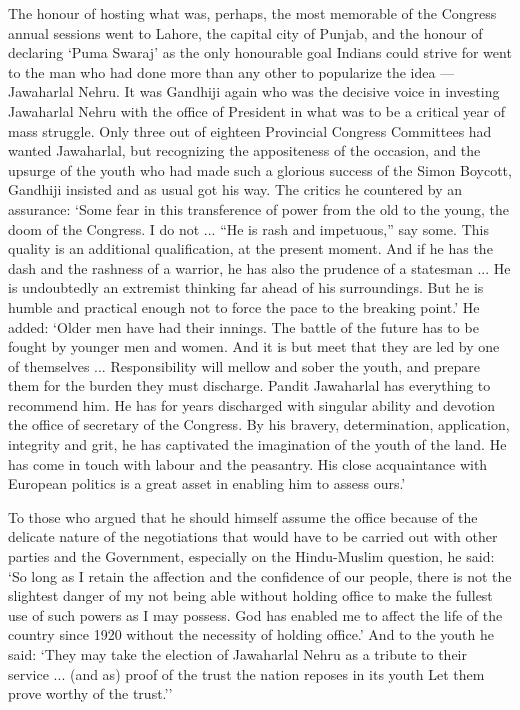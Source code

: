 \begin{multicols}{2}
The honour of hosting what was, perhaps, the most memorable of the Congress annual sessions went to Lahore, the capital city of Punjab, and the honour of declaring `Puma Swaraj' as the only honourable goal Indians could strive for went to the man who had done more than any other to popularize the idea --- Jawaharlal Nehru. It was Gandhiji again who was the decisive voice in investing Jawaharlal Nehru with the office of President in what was to be a critical year of mass struggle. Only three out of eighteen Provincial Congress Committees had wanted Jawaharlal, but recognizing the appositeness of the occasion, and the upsurge of the youth who had made such a glorious success of the Simon Boycott, Gandhiji insisted and as usual got his way. The critics he countered by an assurance: `Some fear in this transference of power from the old to the young, the doom of the Congress. I do not ... ``He is rash and impetuous,'' say some. This quality is an additional qualification, at the present moment. And if he has the dash and the rashness of a warrior, he has also the prudence of a statesman ... He is undoubtedly an extremist thinking far ahead of his surroundings. But he is humble and practical enough not to force the pace to the breaking point.' He added: `Older men have had their innings. The battle of the future has to be fought by younger men and women. And it is but meet that they are led by one of themselves ... Responsibility will mellow and sober the youth, and prepare them for the burden they must discharge. Pandit Jawaharlal has everything to recommend him. He has for years discharged with singular ability and devotion the office of secretary of the Congress. By his bravery, determination, application, integrity and grit, he has captivated the imagination of the youth of the land. He has come in touch with labour and the peasantry. His close acquaintance with European politics is a great asset in enabling him to assess ours.' 

To those who argued that he should himself assume the office because of the delicate nature of the negotiations that would have to be carried out with other parties and the Government, especially on the Hindu-Muslim question, he said: `So long as I retain the affection and the confidence of our people, there is not the slightest danger of my not being able without holding office to make the fullest use of such powers as I may possess. God has enabled me to affect the life of the country since 1920 without the necessity of holding office.' And to the youth he said: `They may take the election of Jawaharlal Nehru as a tribute to their service ... (and as) proof of the trust the nation reposes in its youth Let them prove worthy of the trust.'' 


\end{multicols}
